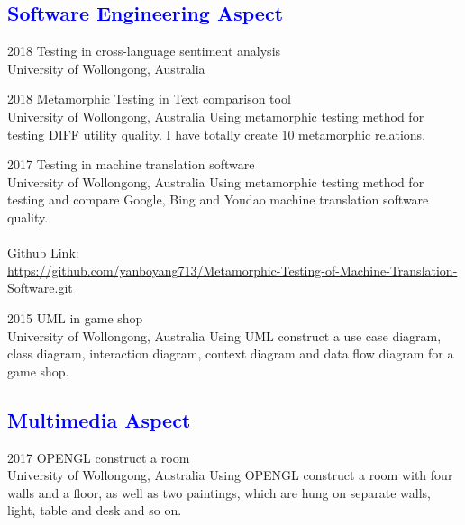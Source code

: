 \documentclass[]{friggeri-cv}
\begin{document}
\subsection*{\textcolor{blue}{Software Engineering Aspect}}
\begin{entrylist}
  \entry
    {2018}
    {Testing in cross-language sentiment analysis\\}
    {University of Wollongong, Australia}
    {}
\end{entrylist}

\begin{entrylist}
  \entry
    {2018}
    {Metamorphic Testing in Text comparison tool\\}
    {University of Wollongong, Australia}
    {Using metamorphic testing method for testing DIFF utility quality. I have totally create 10 metamorphic relations.}
\end{entrylist}

\begin{entrylist}
  \entry
    {2017}
    {Testing in machine translation software\\}
    {University of Wollongong, Australia}
    {Using metamorphic testing method for testing and compare Google, Bing and Youdao machine translation software quality.\\\\ Github Link: \\{\small\url{https://github.com/yanboyang713/Metamorphic-Testing-of-Machine-Translation-Software.git}}}
\end{entrylist}

\begin{entrylist}
  \entry
    {2015}
    {UML in game shop\\}
    {University of Wollongong, Australia}
    {Using UML construct a use case diagram, class diagram, interaction diagram, context diagram and data flow diagram for a game shop.}
\end{entrylist}

\subsection*{\textcolor{blue}{Multimedia Aspect}}
\begin{entrylist}
  \entry
    {2017}
    {OPENGL construct a room\\}
    {University of Wollongong, Australia}
    {Using OPENGL construct a room with four walls and a floor, as well as two paintings, which are hung on separate walls, light, table and desk and so on.}
\end{entrylist}
\end{document}
